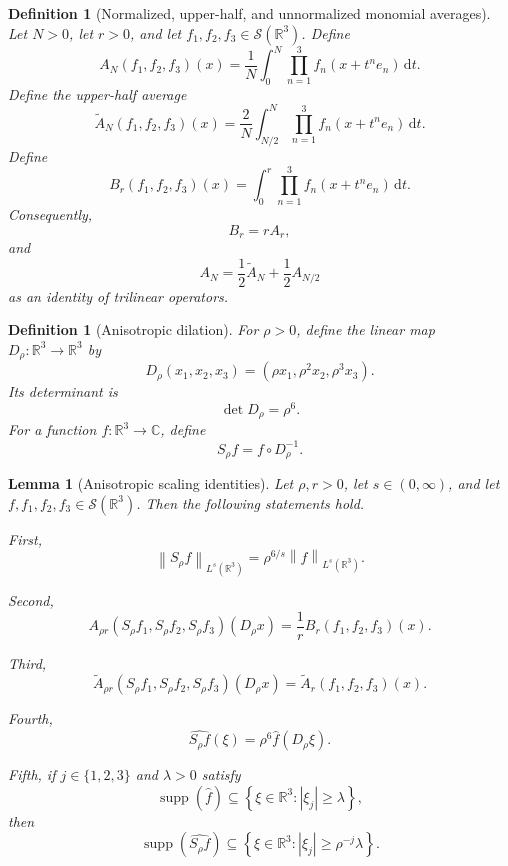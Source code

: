 \documentclass[11pt]{article}
\newtheorem{lemma}[theorem]{Lemma}
\newtheorem{definition}[theorem]{Definition}
\newcommand{\R}{\mathbb{R}}
\newcommand{\Cplx}{\mathbb{C}}
\newcommand{\Sch}{\mathcal{S}}
\newcommand{\supp}{\operatorname{supp}}
\newcommand{\dd}{\,\mathrm{d}}
\newcommand{\norm}[2]{\left\lVert #1\right\rVert_{#2}}
\newcommand{\abs}[1]{\left|#1\right|}
\newcommand{\set}[1]{\left\{#1\right\}}
\newcommand{\indices}{\{1,2,3\}}
\begin{document}
	\begin{definition}[Normalized, upper-half, and unnormalized monomial averages]\label{def:averages}
		Let \(N>0\), let \(r>0\), and let \(f_1,f_2,f_3\in\Sch(\R^3)\).  Define
		\[
		A_N(f_1,f_2,f_3)(x)
		=
		\frac1N\int_0^N\prod_{n=1}^{3}f_n(x+t^n e_n)\dd t.
		\]
		Define the upper-half average
		\[
		\widetilde A_N(f_1,f_2,f_3)(x)
		=
		\frac2N\int_{N/2}^{N}\prod_{n=1}^{3}f_n(x+t^n e_n)\dd t.
		\]
		Define
		\[
		B_r(f_1,f_2,f_3)(x)
		=
		\int_0^r\prod_{n=1}^{3}f_n(x+t^n e_n)\dd t.
		\]
		Consequently,
		\[
		B_r=rA_r,
		\]
		and
		\[
		A_N
		=
		\frac12\widetilde A_N+\frac12 A_{N/2}
		\]
		as an identity of trilinear operators.
	\end{definition}
	
	\begin{definition}[Anisotropic dilation]\label{def:dilation}
		For \(\rho>0\), define the linear map \(D_\rho:\R^3\to\R^3\) by
		\[
		D_\rho(x_1,x_2,x_3)=(\rho x_1,\rho^2x_2,\rho^3x_3).
		\]
		Its determinant is
		\[
		\det D_\rho=\rho^6.
		\]
		For a function \(f:\R^3\to\Cplx\), define
		\[
		S_\rho f=f\circ D_\rho^{-1}.
		\]
	\end{definition}
	
	\begin{lemma}[Anisotropic scaling identities]\label{lem:scaling}
		Let \(\rho,r>0\), let \(s\in(0,\infty)\), and let \(f,f_1,f_2,f_3\in\Sch(\R^3)\).  Then the following statements hold.
		
		First,
		\[
		\norm{S_\rho f}{L^s(\R^3)}=\rho^{6/s}\norm{f}{L^s(\R^3)}.
		\]
		
		Second,
		\[
		A_{\rho r}(S_\rho f_1,S_\rho f_2,S_\rho f_3)(D_\rho x)
		=
		\frac1r B_r(f_1,f_2,f_3)(x).
		\]
		
		Third,
		\[
		\widetilde A_{\rho r}(S_\rho f_1,S_\rho f_2,S_\rho f_3)(D_\rho x)
		=
		\widetilde A_r(f_1,f_2,f_3)(x).
		\]
		
		Fourth,
		\[
		\widehat{S_\rho f}(\xi)=\rho^6\widehat f(D_\rho\xi).
		\]
		
		Fifth, if \(j\in\indices\) and \(\lambda>0\) satisfy
		\[
		\supp(\widehat f)\subseteq\set{\xi\in\R^3:\abs{\xi_j}\geq\lambda},
		\]
		then
		\[
		\supp(\widehat{S_\rho f})
		\subseteq
		\set{\xi\in\R^3:\abs{\xi_j}\geq\rho^{-j}\lambda}.
		\]
	\end{lemma}
	
\end{document}
